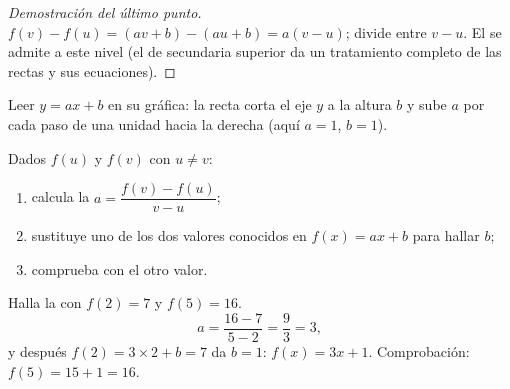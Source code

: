 \begin{proof}[Demostración del último punto]
$f(v) - f(u) = (av + b) - (au + b) = a(v - u)$; divide entre $v - u$. El
 se admite a este nivel (el  de secundaria superior da un tratamiento
completo de las rectas y sus ecuaciones).
\end{proof}

\begin{omfigure}

{\small Leer $y = ax + b$ en su gráfica: la recta corta el eje $y$
a la altura $b$ y sube $a$ por cada paso de una unidad hacia la derecha (aquí
$a = 1$, $b = 1$).}
\end{omfigure}

\begin{method}\label{met:g9:linfunc:findaffine}
Dados $f(u)$ y $f(v)$ con $u \neq v$:
\begin{enumerate}
  \item calcula la  $a = \dfrac{f(v) - f(u)}{v - u}$;
  \item sustituye uno de los dos valores conocidos en $f(x) = ax + b$ para
        hallar $b$;
  \item comprueba con el otro valor.
\end{enumerate}
\end{method}

\begin{example}\label{ex:g9:linfunc:findaffine}
Halla la  con $f(2) = 7$ y $f(5) = 16$.
\[
a = \frac{16 - 7}{5 - 2} = \frac93 = 3 ,
\]
y después $f(2) = 3 \times 2 + b = 7$ da $b = 1$: $f(x) = 3x + 1$. Comprobación:
$f(5) = 15 + 1 = 16$.
\end{example}

